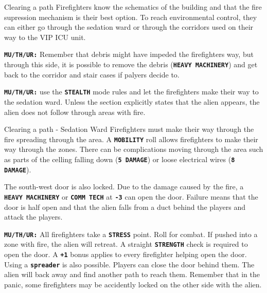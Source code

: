 \begin{rpg-commentbox}{Clearing a path}
   Firefighters know the schematics of the building and that the fire supression mechanism is their best option. To reach environmental control, they can either go through the sedation ward or through the corridors used on their way to the VIP ICU unit. 
   
   \texttt{\textbf{MU/TH/UR:}} Remember that debris might have impeded the firefighters way, but through this side, it is possible to remove the debris (\texttt{\textbf{HEAVY MACHINERY}}) and get back to the corridor and stair cases if palyers decide to.

   \texttt{\textbf{MU/TH/UR:}} use the \texttt{\textbf{STEALTH}} mode rules and let the firefighters make their way to the sedation ward. Unless the section explicitly states that the alien appears, 
   the alien does not follow through areas with fire.
\end{rpg-commentbox}      

\newsect

\begin{rpg-commentbox}{Clearing a path - Sedation Ward}
   Firefighters must make their way through the fire spreading through the area. A \texttt{\textbf{MOBILITY}} roll allows firefighters to make their way through the zones. There can be complications moving through the area such as parts of the celling falling down (\texttt{\textbf{5 DAMAGE}}) or loose electrical wires (\texttt{\textbf{8 DAMAGE}}).

   The south-west door is also locked. Due to the damage caused by the fire, a \texttt{\textbf{HEAVY MACHINERY}} or \texttt{\textbf{COMM TECH}} at \texttt{\textbf{-3}} can open the door. Failure means that the door is half open and that the alien falls from a duct behind the players and attack the players. 
   


   \texttt{\textbf{MU/TH/UR:}} All firefighters take a \texttt{\textbf{STRESS}} point. Roll for combat. If pushed into a zone with fire, the alien will retreat. A straight \texttt{\textbf{STRENGTH}} check is required to open the door. A \texttt{\textbf{+1}}  bonus applies to every firefighter helping open the door. Using a \texttt{\textbf{spreader}} is also possible. Players can close the door behind them. The alien will back away and find another path to reach them. Remember that in the panic, some firefighters may be accidently locked on the other side with the alien.
\end{rpg-commentbox}  


